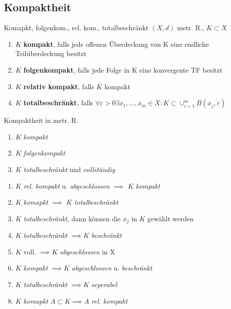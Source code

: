 \subsection{Kompaktheit}

\begin{definition}{Komapkt, folgenkom., rel. kom., totalbeschränkt}
  $(X,d)$ metr. R., $K \subset X$
  \begin{enumerate}[label = (\roman*)]
    \item $K$ \textbf{kompakt}, falls jede offenen Überdeckung von K eine
      endliche Teilüberdeckung besitzt
    \item $K$ \textbf{folgenkompakt}, falls jede Folge in K eine konvergente TF
      besitzt
    \item $K$ \textbf{relativ kompakt}, falls $\overline{K}$ kompakt
    \item $K$ \textbf{totalbeschränkt}, falls
      $\forall \varepsilon >0 \exists x_1,...,x_m \in X:
      K \subset \cup_{i=1}^{m}B(x_j,\varepsilon) $
  \end{enumerate}
\end{definition}

\begin{satz}{Kompaktheit in metr. R.}
  \begin{enumerate}[label = $\Leftrightarrow$]
    \item $K$ \textit{kompakt}
    \item $K$ \textit{folgenkompakt}
    \item $K$ \textit{totalbeschränkt} und \textit{vollständig}
  \end{enumerate}
\end{satz}

\begin{bemerkung}
  \begin{enumerate}[label=(\roman*)]
    \item $K$ \textit{rel. kompakt} u. \textit{abgeschlossen}
      $\implies$ $K$ \textit{kompakt}
    \item $K$ \textit{komapkt} $\implies$ $K$ \textit{totalbeschränkt}
    \item $K$ \textit{totalbeschränkt}, dann können die $x_j$ in $K$
      gewählt werden
    \item $K$ \textit{totalbeschränkt} $\implies K$ \textit{beschränkt}
    \item $K$ voll. $\implies K$ \textit{abgeschlossen} in X
    \item $K$ \textit{kompakt} $\implies K$ \textit{abgeschlossen} u.
      \textit{beschränkt}
    \item $K$ \textit{totalbeschränkt} $\implies K$
      \textit{seperabel}
    \item $K$ \textit{komapkt} $A \subset K \implies A$ \textit{rel. kompakt}
  \end{enumerate}
\end{bemerkung}


